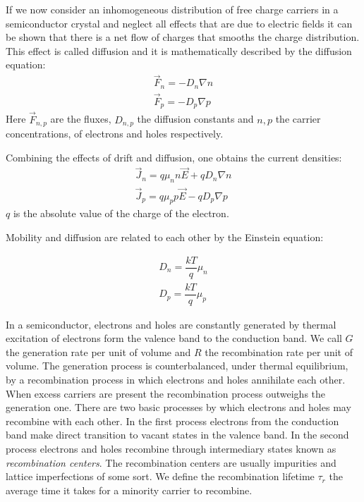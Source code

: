 If we now consider an inhomogeneous distribution of free charge carriers in a semiconductor crystal 
and neglect all effects that are due to electric fields it can be shown that there is a net flow 
of charges that smooths the charge distribution. This effect is called diffusion and it is mathematically 
described by the diffusion equation:
\begin{align}
\vec{F}_n=-D_n\nabla{n}\label{eq:nDiff}\\
\vec{F}_p=-D_p\nabla{p}\label{eq:pDiff}
\end{align}
Here $\vec{F}_{n,p}$ are the fluxes, $D_{n,p}$ the diffusion constants and 
 $n,p$ the carrier concentrations,  of electrons and holes respectively.

Combining the effects of drift and diffusion, one obtains the current densities:
\begin{align}
\vec{J}_n=q\mu_nn\vec{E}+qD_n\nabla{n}\label{eq:nCurrf}\\
\vec{J}_p=q\mu_pp\vec{E}-qD_p\nabla{p}\label{eq:pCurr}
\end{align}
$q$ is the absolute value of the charge of the electron.

Mobility and diffusion are related to each other by the Einstein equation:

\begin{align}
D_n=\dfrac{kT}{q}\mu_n\label{nEinst}\\
D_p=\dfrac{kT}{q}\mu_p\label{pEinst}
\end{align}

In a semiconductor, electrons and holes are constantly generated by thermal excitation of electrons 
form the valence band to the conduction band. We call $G$ the  generation rate per unit of 
volume and $R$ the  recombination rate per unit of volume. 
The generation process is counterbalanced, under 
thermal equilibrium, by a recombination process in which electrons and holes annihilate each other. 
When excess carriers are present the recombination process outweighs the generation one. 
There are two basic processes by which electrons and holes may recombine with each other. In the 
first process electrons from the conduction band make direct transition to vacant states in the valence 
band. In the second process electrons and holes recombine through intermediary states known as 
{\it recombination centers}. The recombination centers are usually impurities and lattice imperfections 
of some sort. 
We define the recombination lifetime $\tau_r$ the average time it takes for a minority carrier to 
recombine. 


